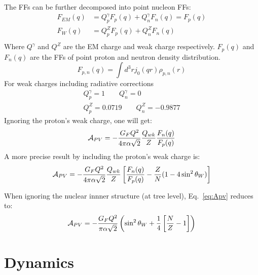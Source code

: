 The FFs can be further decomposed into point nucleon FFs:
\begin{equation}
    \begin{aligned}
	F_{EM}(q) &= Q^\gamma_p F_p(q) + Q^\gamma_n F_n(q)  = F_p(q)	\\
	F_{W}(q)  &= Q^Z_p F_p(q) + Q^Z_n F_n(q)  \\
    \end{aligned}
\end{equation}
Where $Q^\gamma$ and $Q^Z$ are the EM charge and weak charge respectively.
$F_p(q)$ and $F_n(q)$ are the FFs of point proton and neutron density distribution. 
\begin{equation}
    F_{p,n}(q) = \int d^3r j_0(qr) \rho_{p,n}(r)
\end{equation}
For weak charges including radiative corrections
\begin{equation}
    \begin{gathered}
	Q^\gamma_p = 1  \qquad Q^\gamma_n = 0   \\
	Q^Z_p = 0.0719    \qquad Q^Z_n = -0.9877
    \end{gathered}
\end{equation}
Ignoring the proton's weak charge, one will get:
\begin{equation}
    \mathcal{A}_{PV} = -\frac{G_FQ^2}{4\pi\alpha\sqrt{2}}\frac{Q_{wk}}{Z} \frac{F_n(q)}{F_p(q)} 
\end{equation}
A more precise result by including the proton's weak charge is:
\begin{equation}
    \mathcal{A}_{PV} = -\frac{G_FQ^2}{4\pi\alpha\sqrt{2}}\frac{Q_{wk}}{Z}\left[ \frac{F_n(q)}{F_p(q)} - \frac{Z}{N}(1-4\sin^2\theta_W) \right]
    \label{eq:Apv}
\end{equation}

When ignoring the nuclear innner structure (at tree level), Eq.~\ref{eq:Apv} reduces to:
\begin{equation}
    \mathcal{A}_{PV} = -\frac{G_F Q^2}{\pi\alpha\sqrt{2}} \left(\sin^2\theta_W + \frac{1}{4}\left[ \frac{N}{Z} - 1 \right] \right)
\end{equation}

\section{Dynamics}
\begin{center}
\end{center}

